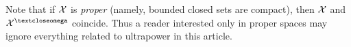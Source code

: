 \documentclass[oneside,a4paper]{article}
\def\claim#1{%
\par%
\medskip%
\noindent%
\refstepcounter{thm}%
\hbox{\bf\boldmath \arabic{section}.\arabic{thm}. #1.}
\it\ %
}
\begin{document}
Note that if $\mathcal{X}$ is \textit{proper} (namely, bounded closed sets are compact), then $\mathcal{X}$ and $\spc{X}^\o$ coincide.
Thus a reader interested only in proper spaces may ignore everything related to ultrapower in this article.


\appendix
\def\claim#1{%
\par%
\medskip%
\noindent%
\refstepcounter{thm}%
\hbox{\bf\boldmath \Alph{section}.\arabic{thm}. #1.}
\it\ %
}



\end{document}
